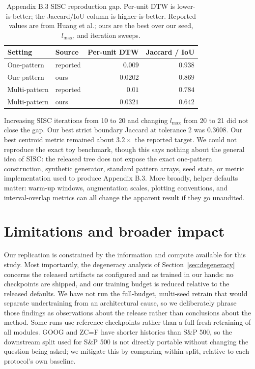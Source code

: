 \documentclass{article}
\begin{document}
\begin{table}[h]
  \caption{Appendix B.3 SISC reproduction gap. Per-unit DTW is lower-is-better; the Jaccard/IoU column is higher-is-better. Reported values are from Huang et al.; ours are the best over our seed, $l_{\max}$, and iteration sweeps.}
  \label{tab:b3}
  \centering
  \small
  \begin{tabular}{llrr}
    \toprule
    Setting & Source & Per-unit DTW & Jaccard / IoU \\
    \midrule
    One-pattern & reported & $0.009$ & $0.938$ \\
    One-pattern & ours & $0.0202$ & $0.869$ \\
    Multi-pattern & reported & $0.01$ & $0.784$ \\
    Multi-pattern & ours & $0.0321$ & $0.642$ \\
    \bottomrule
  \end{tabular}
\end{table}

Increasing SISC iterations from 10 to 20 and changing $l_{\max}$ from 20 to 21 did not close the gap. Our best strict boundary Jaccard at tolerance 2 was $0.3608$. Our best centroid metric remained about $3.2\times$ the reported target. We could not reproduce the exact toy benchmark, though this says nothing about the general idea of SISC: the released tree does not expose the exact one-pattern construction, synthetic generator, standard pattern arrays, seed state, or metric implementation used to produce Appendix B.3. More broadly, helper defaults matter: warm-up windows, augmentation scales, plotting conventions, and interval-overlap metrics can all change the apparent result if they go unaudited.

\section{Limitations and broader impact}

Our replication is constrained by the information and compute available for this study. Most importantly, the degeneracy analysis of Section~\ref{sec:degeneracy} concerns the released artifacts as configured and as trained in our hands: no checkpoints are shipped, and our training budget is reduced relative to the released defaults. We have not run the full-budget, multi-seed retrain that would separate undertraining from an architectural cause, so we deliberately phrase those findings as observations about the release rather than conclusions about the method. Some runs use reference checkpoints rather than a full fresh retraining of all modules. GOOG and ZC=F have shorter histories than S\&P 500, so the downstream split used for S\&P 500 is not directly portable without changing the question being asked; we mitigate this by comparing within split, relative to each protocol's own baseline.
\end{document}
